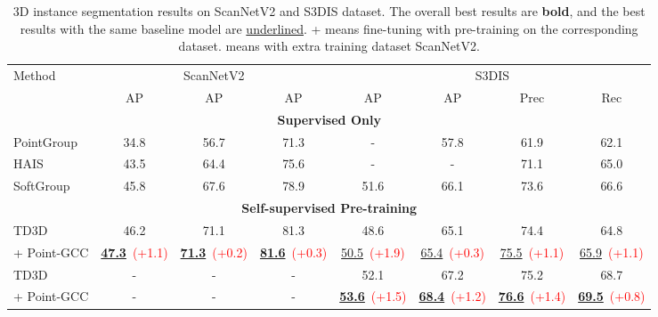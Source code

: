 \documentclass{article}
\begin{document}
\begin{table}
\centering
\resizebox{0.85\linewidth}{!}
{
   \begin{tabular}{lccccccc}
    \toprule
    \multirow{2}{*}{Method} & \multicolumn{3}{c}{ScanNetV2} & \multicolumn{4}{c}{S3DIS} \\
    \cmidrule(r){2-4}
    \cmidrule(r){5-8}
     & AP & AP &  AP & AP & AP & Prec & Rec   \\
    \midrule
    \multicolumn{8}{c}{\textbf{Supervised Only}} \\
    \midrule
    PointGroup~\cite{PointGroup}& 34.8 & 56.7 & 71.3 & - & 57.8 & 61.9 & 62.1 \\
    HAIS~\cite{HAIS} & 43.5 & 64.4 & 75.6 & - & - & 71.1 & 65.0 \\
    SoftGroup~\cite{SoftGroup} & 45.8 & 67.6 & 78.9 & 51.6 & 66.1 & 73.6 & 66.6 \\
    \midrule
    \multicolumn{8}{c}{\textbf{Self-supervised Pre-training}} \\
    \midrule
    TD3D~\cite{TD3D} & 46.2 & 71.1 & 81.3 & 48.6 & 65.1 & 74.4 & 64.8 \\
    \rowcolor{linecolor2}+ Point-GCC & \textbf{\underline{47.3}}~\tiny{\textcolor{red}{(+1.1)}} & \textbf{\underline{71.3}}~\tiny{\textcolor{red}{(+0.2)}} & \textbf{\underline{81.6}}~\tiny{\textcolor{red}{(+0.3)}} & \underline{50.5}~\tiny{\textcolor{red}{(+1.9)}} & \underline{65.4}~\tiny{\textcolor{red}{(+0.3)}} & \underline{75.5}~\tiny{\textcolor{red}{(+1.1)}} & \underline{65.9}~\tiny{\textcolor{red}{(+1.1)}} \\
    \midrule
    TD3D~\cite{TD3D}& - & - & - & 52.1 & 67.2 & 75.2 & 68.7 \\
    \rowcolor{linecolor}+ Point-GCC & - & - & - & \textbf{\underline{53.6}}~\tiny{\textcolor{red}{(+1.5)}} & \textbf{\underline{68.4}}~\tiny{\textcolor{red}{(+1.2)}} & \textbf{\underline{76.6}}~\tiny{\textcolor{red}{(+1.4)}} & \textbf{\underline{69.5}}~\tiny{\textcolor{red}{(+0.8)}} \\
    \bottomrule
  \end{tabular}
}
\vspace{-0.2cm}
\caption{3D instance segmentation results on ScanNetV2 and S3DIS dataset. The overall best results are \textbf{bold}, and the best results with the same baseline model are \underline{underlined}. + means fine-tuning with pre-training on the corresponding dataset.  means with extra training dataset ScanNetV2.}
\label{instance-table}
\end{table}
\end{document}
